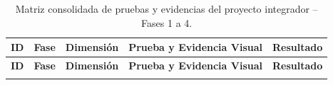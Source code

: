 \documentclass[12pt,a4paper]{article}
\begin{document}
\small
\renewcommand{\arraystretch}{1.25}
\begin{xltabular}{\textwidth}{|c|c|>{\raggedright\arraybackslash}p{2.3cm}|X|c|}
\caption{Matriz consolidada de pruebas y evidencias del proyecto integrador -- Fases 1 a 4.} \label{tab:matriz_pruebas_consolidada} \\

\hline
{} \color{white}\textbf{ID} & \color{white}\textbf{Fase} & \color{white}\textbf{Dimensión} & \color{white}\textbf{Prueba y Evidencia Visual} & \color{white}\textbf{Resultado} \\ \hline
\endfirsthead
\hline
{} \color{white}\textbf{ID} & \color{white}\textbf{Fase} & \color{white}\textbf{Dimensión} & \color{white}\textbf{Prueba y Evidencia Visual} & \color{white}\textbf{Resultado} \\ \hline
\endhead

\hline
\endfoot


\end{xltabular}
\end{document}
